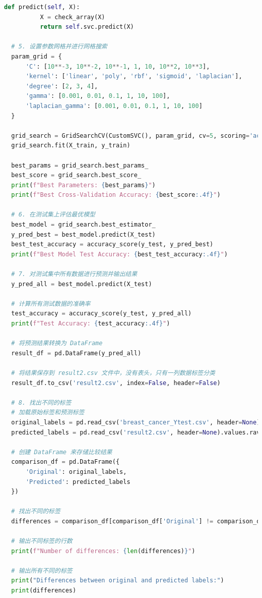 \documentclass[12pt]{article}
\begin{document}
\begin{lstlisting}[language=python]
      def predict(self, X):
          X = check_array(X)
          return self.svc.predict(X)
  
  # 5. 设置参数网格并进行网格搜索
  param_grid = {
      'C': [10**-3, 10**-2, 10**-1, 1, 10, 10**2, 10**3],
      'kernel': ['linear', 'poly', 'rbf', 'sigmoid', 'laplacian'],
      'degree': [2, 3, 4],
      'gamma': [0.001, 0.01, 0.1, 1, 10, 100],
      'laplacian_gamma': [0.001, 0.01, 0.1, 1, 10, 100]
  }
  
  grid_search = GridSearchCV(CustomSVC(), param_grid, cv=5, scoring='accuracy')
  grid_search.fit(X_train, y_train)
  
  best_params = grid_search.best_params_
  best_score = grid_search.best_score_
  print(f"Best Parameters: {best_params}")
  print(f"Best Cross-Validation Accuracy: {best_score:.4f}")
  
  # 6. 在测试集上评估最优模型
  best_model = grid_search.best_estimator_
  y_pred_best = best_model.predict(X_test)
  best_test_accuracy = accuracy_score(y_test, y_pred_best)
  print(f"Best Model Test Accuracy: {best_test_accuracy:.4f}")
  
  # 7. 对测试集中所有数据进行预测并输出结果
  y_pred_all = best_model.predict(X_test)
  
  # 计算所有测试数据的准确率
  test_accuracy = accuracy_score(y_test, y_pred_all)
  print(f"Test Accuracy: {test_accuracy:.4f}")
  
  # 将预测结果转换为 DataFrame
  result_df = pd.DataFrame(y_pred_all)
  
  # 将结果保存到 result2.csv 文件中，没有表头，只有一列数据标签分类
  result_df.to_csv('result2.csv', index=False, header=False)
  
  # 8. 找出不同的标签
  # 加载原始标签和预测标签
  original_labels = pd.read_csv('breast_cancer_Ytest.csv', header=None).values.ravel()
  predicted_labels = pd.read_csv('result2.csv', header=None).values.ravel()
  
  # 创建 DataFrame 来存储比较结果
  comparison_df = pd.DataFrame({
      'Original': original_labels,
      'Predicted': predicted_labels
  })
  
  # 找出不同的标签
  differences = comparison_df[comparison_df['Original'] != comparison_df['Predicted']]
  
  # 输出不同标签的行数
  print(f"Number of differences: {len(differences)}")
  
  # 输出所有不同的标签
  print("Differences between original and predicted labels:")
  print(differences)
  

\end{lstlisting}
\end{document}
